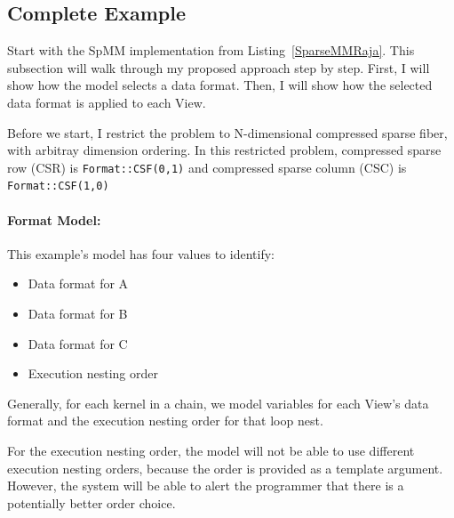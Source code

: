 \documentclass{article}
\begin{document}
\subsection{Complete Example}

Start with the SpMM implementation from Listing~\ref{SparseMMRaja}.
This subsection will walk through my proposed approach step by step.
First, I will show how the model selects a data format. 
Then, I will show how the selected data format is applied to each View.

Before we start, I restrict the problem to N-dimensional compressed sparse fiber, with arbitray dimension ordering. 
In this restricted problem, compressed sparse row (CSR) is \verb.Format::CSF(0,1). and compressed sparse column (CSC) is  \verb.Format::CSF(1,0).

\paragraph{Format Model:}
This example's model has four values to identify:
\begin{itemize}
    \item Data format for A
    \item Data format for B
    \item Data format for C
    \item Execution nesting order
\end{itemize}
Generally, for each kernel in a chain, we model variables for each View's data format and the execution nesting order for that loop nest.


For the execution nesting order, the model will not be able to use different execution nesting orders, because the order is provided as a template argument. 
However, the system will be able to alert the programmer that there is a potentially better order choice.
\end{document}

